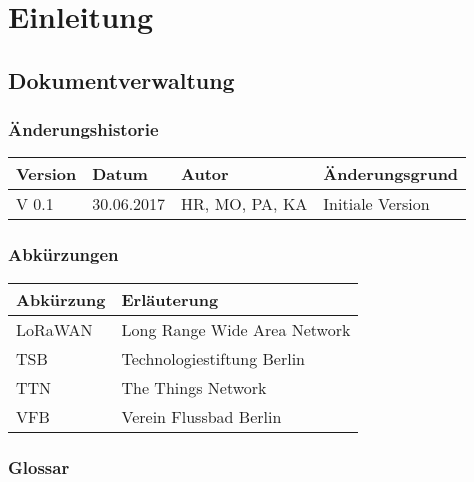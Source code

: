 \section{Einleitung}

\subsection{Dokumentverwaltung}

\subsubsection{Änderungshistorie}

\begin{table}[H] %
\begin{tabularx}{\textwidth}{ |X|X|X|X| }
	\hline  %
	\rowcolor[gray]{.8}%
	\rule{0pt}{18pt}%
	\textbf{Version} & \textbf{Datum} & \textbf{Autor} & \textbf{Änderungsgrund} \\
	\hline  %
	V 0.1 & 30.06.2017 & HR, MO, PA, KA & Initiale Version \\
	\hline
\end{tabularx}
\end{table}

\subsubsection{Abkürzungen}

\begin{table}[H] %
	\centering
	\begin{tabular}{ |l|l| } %
		\hline  %
		\rowcolor[gray]{.8}%
		\rule{0pt}{18pt}%
		\textbf{Abkürzung} & \textbf{Erläuterung} \\
		\hline  %
		LoRaWAN & Long Range Wide Area Network \\
		\hline
		TSB & Technologiestiftung Berlin \\
		\hline
		TTN & The Things Network \\
		\hline
		VFB & Verein Flussbad Berlin \\
		\hline
	\end{tabular}
\end{table}

\subsubsection{Glossar}


